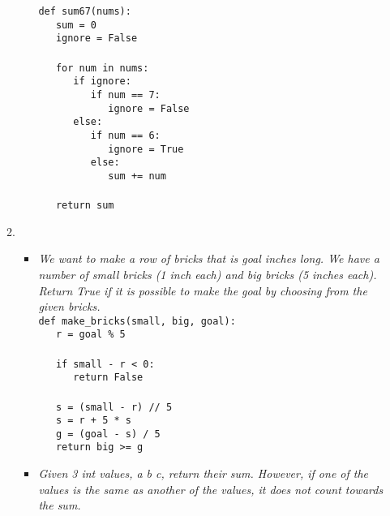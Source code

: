 \documentclass[9pt]{article}
\begin{document}
\begin{enumerate}
\begin{enumerate}
\begin{itemize}
                        \verb|def sum67(nums):| \\
                        \verb|   sum = 0| \\
                        \verb|   ignore = False| \\ \\
                        \verb|   for num in nums:| \\
                        \verb|      if ignore:| \\
                        \verb|         if num == 7:| \\
                        \verb|            ignore = False| \\
                        \verb|      else:| \\
                        \verb|         if num == 6:| \\
                        \verb|            ignore = True| \\
                        \verb|         else:| \\
                        \verb|            sum += num| \\ \\
                        \verb|   return sum| \\
               \end{itemize}
         \item \begin{itemize}
                  \item \textit{We want to make a row of bricks that is goal 
                        inches long. We have a number of small bricks (1 inch 
                        each) and big bricks (5 inches each). Return True if it 
                        is possible to make the goal by choosing from the given 
                        bricks.} \\         
   
                        \verb|def make_bricks(small, big, goal):| \\
                        \verb|   r = goal % 5| \\ \\
                        \verb|   if small - r < 0:| \\
                        \verb|      return False| \\ \\
                        \verb|   s = (small - r) // 5| \\
                        \verb|   s = r + 5 * s| \\
                        \verb|   g = (goal - s) / 5| \\
                        \verb|   return big >= g| \\
                  \item \textit{Given 3 int values, a b c, return their sum. 
                        However, if one of the values is the same as another of 
                        the values, it does not count towards the sum.} \\


\end{itemize}
\end{enumerate}
\end{enumerate}
\end{document}
